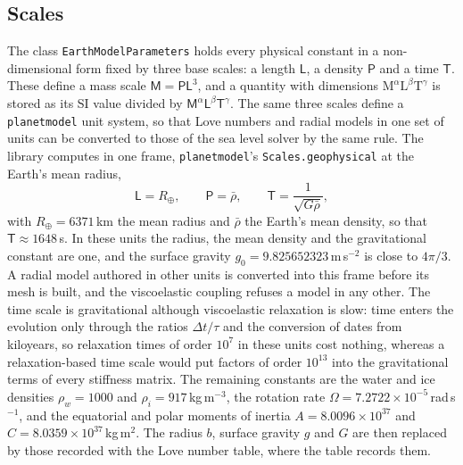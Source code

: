 \documentclass[11pt,a4paper]{article}
\newcommand{\code}[1]{\texttt{#1}}
\numberwithin{equation}{section}
\begin{document}
\subsection{Scales}

The class \code{EarthModelParameters} holds every physical constant in a
non-dimensional form fixed by three base scales: a length $\mathsf{L}$, a
density $\mathsf{P}$ and a time $\mathsf{T}$. These define a mass scale
$\mathsf{M}=\mathsf{P}\mathsf{L}^{3}$, and a quantity with dimensions
$\mathrm{M}^{\alpha}\mathrm{L}^{\beta}\mathrm{T}^{\gamma}$ is stored as its SI
value divided by $\mathsf{M}^{\alpha}\mathsf{L}^{\beta}\mathsf{T}^{\gamma}$.
The same three scales define a \texttt{planetmodel} unit system, so that Love
numbers and radial models in one set of units can be converted to those of the
sea level solver by the same rule. The library computes in one frame,
\texttt{planetmodel}'s \code{Scales.geophysical} at the Earth's mean radius,
\begin{equation}
\mathsf{L} = R_{\oplus},\qquad
\mathsf{P} = \bar\rho,\qquad
\mathsf{T} = \frac{1}{\sqrt{G\bar\rho}},
\label{eq:scales}
\end{equation}
with $R_{\oplus}=6371$\,km the mean radius and $\bar\rho$ the Earth's mean
density, so that $\mathsf{T}\approx1648$\,s. In these units the radius, the mean
density and the gravitational constant are one, and the surface gravity
$g_{0}=9.825652323$\,m\,s$^{-2}$ is close to $4\pi/3$. A radial model authored in
other units is converted into this frame before its mesh is built, and the
viscoelastic coupling refuses a model in any other. The time scale is
gravitational although viscoelastic relaxation is slow: time enters the
evolution only through the ratios $\Delta t/\tau$ and the conversion of dates
from kiloyears, so relaxation times of order $10^{7}$ in these units cost
nothing, whereas a relaxation-based time scale would put factors of order
$10^{13}$ into the gravitational terms of every stiffness matrix. The remaining
constants are the water and ice densities
$\rho_{w}=1000$ and $\rho_{i}=917$\,kg\,m$^{-3}$, the rotation rate
$\Omega=7.2722\times10^{-5}$\,rad\,s$^{-1}$, and the equatorial and polar moments
of inertia $A=8.0096\times10^{37}$ and $C=8.0359\times10^{37}$\,kg\,m$^{2}$.
The radius $b$, surface gravity $g$ and $G$ are then replaced by those recorded
with the Love number table, where the table records them.
\end{document}
